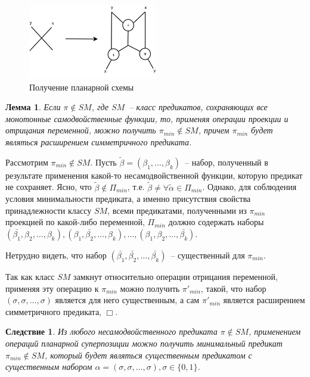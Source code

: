 \documentclass[12pt]{article}
\newtheorem{lemma}[theorem]{Лемма}
\newtheorem{corollary}[theorem]{Следствие}
\newenvironment{proof}[1][Доказательство]{\begin{trivlist}
\item[\hskip \labelsep {\bfseries #1}]}{\end{trivlist}}
\begin{document}
\begin{figure}[htb]
\centering
\includegraphics[width=0.5\textwidth]{intersection.png}
\caption{Получение планарной схемы}
\label{fig:xor}
\end{figure}

\begin{lemma}
\label{eq:lemma_sm}
Если $\pi \notin SM$, где $SM$~-- класс предикатов, сохраняющих все монотонные самодвойственные функции,
то, применяя операции проекции и отрицания переменной,
можно получить $\pi_{min} \notin SM$, причем $\pi_{min}$ будет являться расширением симметричного предиката.
\end{lemma}

\begin{proof}
Рассмотрим $\pi_{min} \notin SM$. Пусть $\widetilde{\beta} = (\beta_1, \dots, \beta_k)$~-- набор, полученный в результате
применения какой-то несамодвойственной функции, которую предикат не сохраняет.
Ясно, что $\widetilde{\beta} \notin \Pi_{min}$, т.е. $\widetilde{\beta} \neq \forall \widetilde{\alpha} \in \Pi_{min}$.
Однако, для соблюдения условия 
минимальности предиката, а именно присутствия свойства принадлежности классу $SM$, всеми предикатами, полученными
из $\pi_{min}$ проекцией по какой-либо переменной,
$\Pi_{min}$ должно содержать наборы 
$(\bar{\beta_1}, \beta_2, \dots, \beta_k), (\beta_1, \bar{\beta_2}, \dots, \beta_k), \dots, (\beta_1, \beta_2, \dots, \bar{\beta_k})$.

Нетрудно видеть, что набор $(\bar{\beta_1}, \bar{\beta_2}, \dots, \bar{\beta_k})$~-- существенный для $\pi_{min}$.

Так как класс $SM$ замкнут относительно операции отрицания переменной,
применяя эту операцию к $\pi_{min}$ можно получить $\pi'_{min}$,
такой, что набор $(\sigma, \sigma, \dots, \sigma)$ является для него существенным, а сам $\pi'_{min}$ является расширением 
симметричного предиката, $\Box$.
\end{proof}

\begin{corollary}
\label{lemma_sm_corollary} Из любого несамодвойственного предиката 
$\pi \notin SM $, применением операций планарной суперпозиции можно получить минимальный предикат $\pi_{min} \notin SM$,
который будет являться существенным предикатом с существенным набором
$ \alpha = (\sigma, \sigma, \dots, \sigma), \sigma \in \{0, 1\}$.
\end{corollary}
\end{document}
